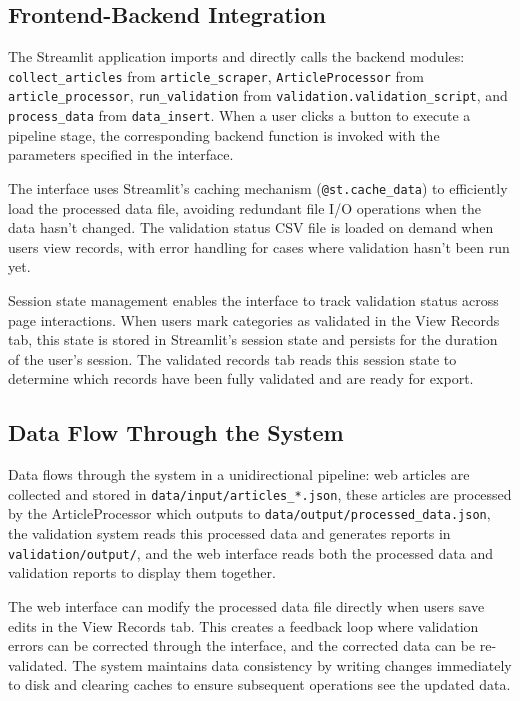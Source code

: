 \documentclass[11pt]{article}
\begin{document}
\subsection{Frontend-Backend Integration}

The Streamlit application imports and directly calls the backend modules: \texttt{collect\_articles} from \texttt{article\_scraper}, \texttt{ArticleProcessor} from \texttt{article\_processor}, \texttt{run\_validation} from \texttt{validation.validation\_script}, and \texttt{process\_data} from \texttt{data\_insert}. When a user clicks a button to execute a pipeline stage, the corresponding backend function is invoked with the parameters specified in the interface.

The interface uses Streamlit's caching mechanism (\texttt{@st.cache\_data}) to efficiently load the processed data file, avoiding redundant file I/O operations when the data hasn't changed. The validation status CSV file is loaded on demand when users view records, with error handling for cases where validation hasn't been run yet.

Session state management enables the interface to track validation status across page interactions. When users mark categories as validated in the View Records tab, this state is stored in Streamlit's session state and persists for the duration of the user's session. The validated records tab reads this session state to determine which records have been fully validated and are ready for export.

\subsection{Data Flow Through the System}

Data flows through the system in a unidirectional pipeline: web articles are collected and stored in \texttt{data/input/articles\_*.json}, these articles are processed by the ArticleProcessor which outputs to \texttt{data/output/processed\_data.json}, the validation system reads this processed data and generates reports in \texttt{validation/output/}, and the web interface reads both the processed data and validation reports to display them together.

The web interface can modify the processed data file directly when users save edits in the View Records tab. This creates a feedback loop where validation errors can be corrected through the interface, and the corrected data can be re-validated. The system maintains data consistency by writing changes immediately to disk and clearing caches to ensure subsequent operations see the updated data.
\end{document}
